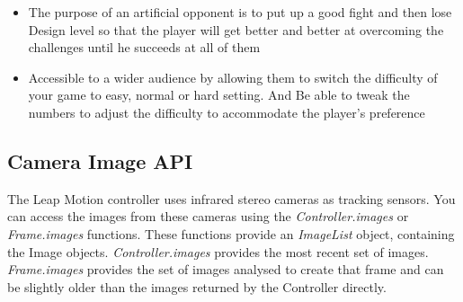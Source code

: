 \documentclass[journal]{IEEEtran}										    %
\begin{document}
\begin{itemize}
                    \item   The purpose of an artificial opponent is to put up a good 
                    fight and then lose Design level so that the player will get better 
                    and better at overcoming the challenges until he succeeds at all of them

                    \item Accessible to a wider audience by allowing them to switch the difficulty 
                    of your game to easy, normal or hard setting. And Be able to tweak the numbers 
                    to adjust the difficulty to accommodate the player’s preference

                \end{itemize}



            \subsection{Camera Image API}
                The Leap Motion controller uses infrared stereo cameras
                as tracking sensors. You can access the images from 
                these cameras using the \emph{Controller.images} or 
                \emph{Frame.images} functions. These functions provide 
                an \emph{ImageList} object, containing the Image objects. 
                \emph{Controller.images} provides the most recent set of images. 
                \emph{Frame.images} provides the set of images analysed to 
                create that frame and can be slightly older than the 
                images returned by the Controller directly. \\
\end{document}
